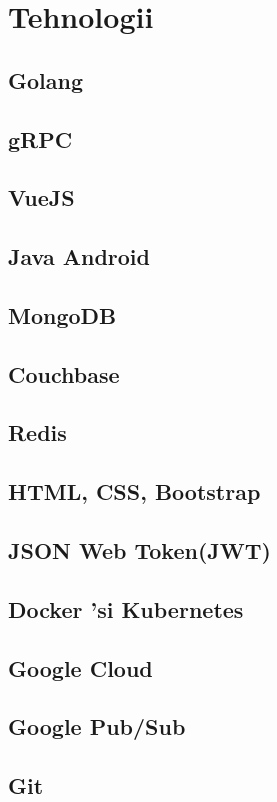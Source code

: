 \documentclass[12pt,a4paper,twoside]{report}
\begin{document}
\section{Tehnologii}
\subsection{Golang}
\subsection{gRPC}
\subsection{VueJS}
\subsection{Java Android}
\subsection{MongoDB}
\subsection{Couchbase}
\subsection{Redis}
\subsection{HTML, CSS, Bootstrap}
\subsection{JSON Web Token(JWT)}
\subsection{Docker 'si Kubernetes}
\subsection{Google Cloud}
\subsection{Google Pub/Sub}
\subsection{Git}
\end{document}

